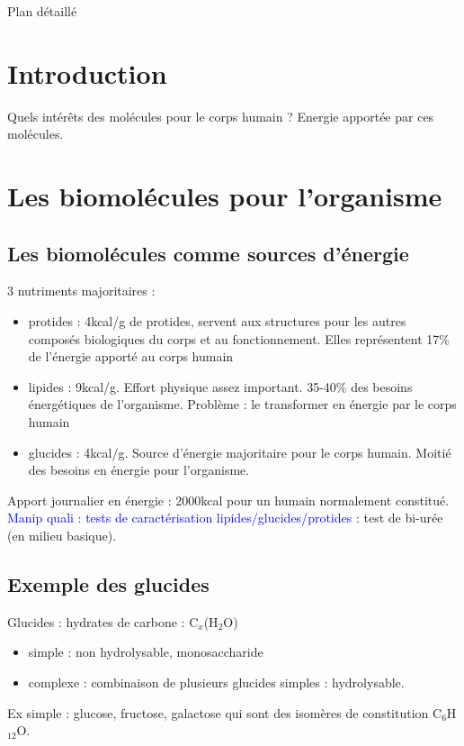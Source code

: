 \begin{reportBlock}{Plan détaillé}
\section*{Introduction }
Quels intérêts des molécules pour le corps humain ? Energie apportée par ces molécules. 

\section{Les biomolécules pour l'organisme}

\subsection{Les biomolécules comme sources d'énergie}
3 nutriments majoritaires :
\begin{itemize}
    \item protides : 4kcal/g de protides, servent aux structures pour les autres composés biologiques du corps et au fonctionnement. Elles représentent 17\% de l'énergie apporté au corps humain
    \item lipides : 9kcal/g. Effort physique assez important. 35-40\% des besoins énergétiques de l'organisme. Problème : le transformer en énergie par le corps humain
    \item glucides : 4kcal/g. Source d'énergie majoritaire pour le corps humain. Moitié des besoins en énergie pour l'organisme.
\end{itemize}
Apport journalier en énergie : 2000kcal pour un humain normalement constitué.\\

\textcolor{blue}{Manip quali : tests de caractérisation lipides/glucides/protides} : test de bi-urée (en milieu basique).

\subsection{Exemple des glucides}
Glucides : hydrates de carbone : C$_x$(H$_2$O)
\begin{itemize}
    \item simple : non hydrolysable, monosaccharide
    \item complexe : combinaison de plusieurs glucides simples : hydrolysable.
\end{itemize}

Ex simple : glucose, fructose, galactose qui sont des isomères de constitution C$_6$H$_{12}$O.\\


\end{reportBlock}
